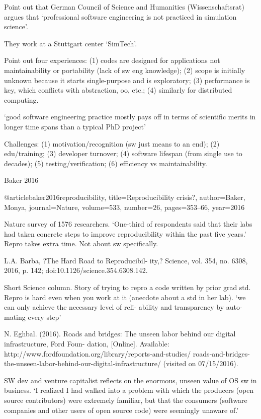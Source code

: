 \documentclass[12pt]{amsart}
\begin{document}
Point out that German Council of Science and Humanities (Wissenschaftsrat) argues that `professional software engineering is not practiced in simulation science'.

They work at a Stuttgart center `SimTech'. 

Point out four experiences: (1) codes are designed for applications not maintainability or portability (lack of sw eng knowledge); (2) scope is initially unknown because it starts single-purpose and is exploratory; (3) performance is key, which conflicts with abstraction, oo, etc.; (4) similarly for distributed computing.

`good software engineering practice mostly pays off in terms of scientific merits in longer time spans than a typical PhD project'

Challenges: (1) motivation/recognition (sw just means to an end); (2) edu/training; (3) developer turnover; (4) software lifespan (from single use to decades); (5) testing/verification; (6) efficiency vs maintainability.


Baker 2016

@article{baker2016reproducibility,
  title={Reproducibility crisis?},
  author={Baker, Monya},
  journal={Nature},
  volume={533},
  number={26},
  pages={353--66},
  year={2016}
}

Nature survey of 1576 researchers. `One-third of respondents said that their labs had taken concrete steps to improve reproducibility within the past five years.' Repro takes extra time. Not about sw specifically.


L.A. Barba, ?The Hard Road to Reproducibil- ity,? Science, vol. 354, no. 6308, 2016, p. 142; doi:10.1126/science.354.6308.142.

Short Science column. Story of trying to repro a code written by prior grad std. Repro is hard even when you work at it (anecdote about a std in her lab). `we can only achieve the necessary level of reli- ability and transparency by auto- mating every step'


N. Eghbal. (2016). Roads and bridges: The unseen labor behind our digital infrastructure, Ford Foun- dation, [Online]. Available: http://www.fordfoundation.org/library/reports-and-studies/ roads-and-bridges-the-unseen-labor-behind-our-digital-infrastructure/ (visited on 07/15/2016).

SW dev and venture capitalist reflects on the enormous, unseen value of OS sw in business. `I realized I had walked into a problem with which the producers (open source contributors) were extremely familiar, but that the consumers (software companies and other users of open source code) were seemingly unaware of.'
\end{document}
